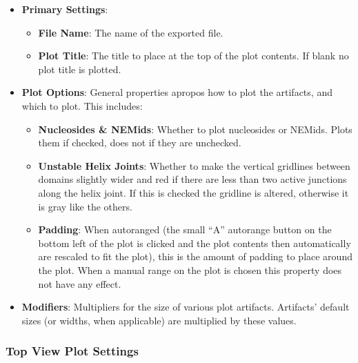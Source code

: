 \documentclass[titlepage]{article}
\begin{document}
\begin{itemize}
	\item \textbf{Primary Settings}: 
	\begin{itemize}
		\item \textbf{File Name}: The name of the exported file.
		\item \textbf{Plot Title}: The title to place at the top of the plot contents. If blank no plot title is plotted.
	\end{itemize}
	
	\item \textbf{Plot Options}: General properties apropos how to plot the artifacts, and which to plot. This includes:
	\begin{itemize}
		\item \textbf{Nucleosides \& NEMids}: Whether to plot nucleosides or NEMids. Plots them if checked, does not if they are unchecked.
		
		\item \textbf{Unstable Helix Joints}: Whether to make the vertical gridlines between domains slightly wider and red if there are less than two active junctions along the helix joint. If this is checked the gridline is altered, otherwise it is gray like the others.
		
		\item \textbf{Padding}: When autoranged (the small ``A'' autorange button on the bottom left of the plot is clicked and the plot contents then automatically are rescaled to fit the plot), this is the amount of padding to place around the plot. When a manual range on the plot is chosen this property does not have any effect.
	\end{itemize}
	
	\item \textbf{Modifiers}: Multipliers for the size of various plot artifacts. Artifacts' default sizes (or widths, when applicable) are multiplied by these values.
\end{itemize}

\subsubsection{Top View Plot Settings}
\end{document}
